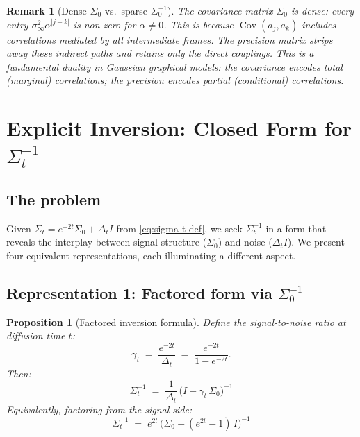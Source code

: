\documentclass[11pt,a4paper]{article}
\newtheorem{proposition}[theorem]{Proposition}
\newtheorem{remark}[theorem]{Remark}
\newcommand{\Cov}{\operatorname{Cov}}
\newcommand{\Dt}{\Delta_t}
\newcommand{\siginf}{\sigma_\infty^2}
\begin{document}
\begin{remark}[Dense $\Sigma_0$ vs.\ sparse $\Sigma_0^{-1}$]\label{rem:dense-vs-sparse}
The covariance matrix $\Sigma_0$ is \emph{dense}: every entry $\siginf \alpha^{|j-k|}$ is non-zero for $\alpha \neq 0$.  This is because $\Cov(a_j, a_k)$ includes correlations mediated by \emph{all} intermediate frames.  The precision matrix strips away these indirect paths and retains only the direct couplings.  This is a fundamental duality in Gaussian graphical models: the covariance encodes total (marginal) correlations; the precision encodes partial (conditional) correlations.
\end{remark}

\section{Explicit Inversion: Closed Form for $\Sigma_t^{-1}$}
\label{sec:inversion}

\subsection{The problem}

Given $\Sigma_t = e^{-2t}\Sigma_0 + \Dt I$ from \eqref{eq:sigma-t-def}, we seek $\Sigma_t^{-1}$ in a form that reveals the interplay between signal structure ($\Sigma_0$) and noise ($\Dt I$).  We present four equivalent representations, each illuminating a different aspect.

\subsection{Representation 1: Factored form via $\Sigma_0^{-1}$}
\label{sec:factored}

\begin{proposition}[Factored inversion formula]\label{prop:factored}
Define the \emph{signal-to-noise ratio} at diffusion time $t$:
\begin{equation}\label{eq:gamma}
  \gamma_t \;=\; \frac{e^{-2t}}{\Dt} \;=\; \frac{e^{-2t}}{1 - e^{-2t}}.
\end{equation}
Then:
\begin{equation}\label{eq:sigma-t-inv-factored}
  \boxed{\;\Sigma_t^{-1} \;=\; \frac{1}{\Dt}\,\bigl(I + \gamma_t\, \Sigma_0\bigr)^{-1}\;}
\end{equation}
Equivalently, factoring from the signal side:
\begin{equation}\label{eq:sigma-t-inv-factored2}
  \boxed{\;\Sigma_t^{-1} \;=\; e^{2t}\,\bigl(\Sigma_0 + (e^{2t} - 1)\,I\bigr)^{-1}\;}
\end{equation}
\end{proposition}
\end{document}
